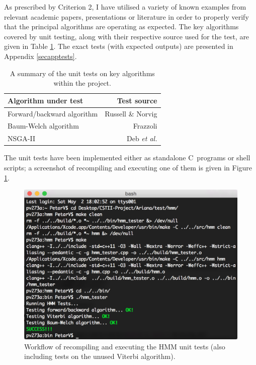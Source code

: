 \documentclass[12pt,a4paper,twoside,openright]{report}
\def\CC{{C\nolinebreak[4]\hspace{-.05em}\raisebox{.4ex}{\tiny\bf ++}}}
\begin{document}
As prescribed by Criterion 2, I have utilised a variety of known examples from relevant academic papers, presentations or literature in order to properly verify that the principal algorithms are operating as expected. The key algorithms covered by unit testing, along with their respective source used for the test, are given in Table \ref{tbldut}. The exact tests (with expected outputs) are presented in Appendix \ref{secapptests}.
\begin{table}[H]\centering
\begin{tabular}{ l  r } \toprule
{\bf Algorithm under test} & {\bf Test source}\\ \midrule
Forward/backward algorithm & Russell \& Norvig \cite{Russell:2003:AIM:773294}\\
Baum-Welch algorithm & Frazzoli \cite{FrazzoliMIT}\\
NSGA-II & Deb \emph{et al.} \cite{deb2002fast}\\
\bottomrule
\end{tabular}
\caption[A summary of the unit tests on key algorithms]{A summary of the unit tests on key algorithms within the project.}\label{tbldut}
\end{table} 
\noindent The unit tests have been implemented either as standalone \CC\ programs or shell scripts; a screenshot of recompiling and executing one of them is given in Figure \ref{figunit}.
\begin{figure}[h]
\includegraphics[width=\linewidth]{figs/unittest.png}
\caption[Screenshot of an HMM unit test]{\centering Workflow of recompiling and executing the HMM unit tests (also including tests on the unused Viterbi algorithm).}\label{figunit}
\end{figure}
\end{document}
